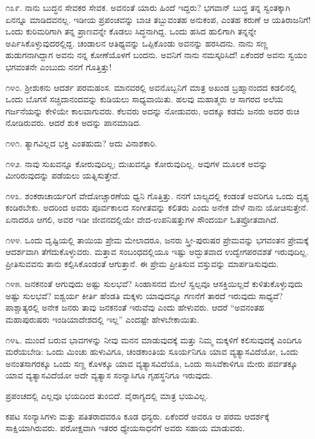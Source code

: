 ೧೩೯. ನಾನು ಬುದ್ಧನ ಸೇವಕರ ಸೇವಕ. ಅವನಂತೆ ಯಾರು ಹಿಂದೆ ಇದ್ದರು? ಭಗವಾನ್ ಬುದ್ಧ ತನ್ನ ಸ್ವಂತಕ್ಕಾಗಿ ಏನನ್ನೂ ಮಾಡಿದವನಲ್ಲ. ಇಡೀಯ ಪ್ರಪಂಚವನ್ನು ಬಾಚಿ ತಬ್ಬುವಂತಹ ಅನುಕಂಪ, ಎಂತಹ ಕರುಣೆ ಆ ಯತಿರಾಜನಿಗೆ! ಒಂದು ಕುರಿಮರಿಗಾಗಿ ತನ್ನ ಪ್ರಾಣವನ್ನೇ ಕೊಡಲು ಸಿದ್ಧನಾಗಿದ್ದ. ಒಂದು ಹಸಿದ ಹುಲಿಗಾಗಿ ತನ್ನನ್ನೇ ಅರ್ಪಿಸಿಕೊಳ್ಳುವುದರಲ್ಲಿದ್ದ. ಚಂಡಾಲನ ಆತಿಥ್ಯವನ್ನು ಒಪ್ಪಿಕೊಂಡು ಅವನನ್ನು ಹರಸಿದನು. ನಾನು ಸಣ್ಣ ಹುಡುಗನಾಗಿದ್ದಾಗ ಅವನು ನನ್ನ ಕೋಣೆಯೊಳಗೆ ಬಂದನು. ಅವನಿಗೆ ನಾನು ನಮಸ್ಕರಿಸಿದೆ! ಏಕೆಂದರೆ ಅವನು ಸ್ವಯಂ ಭಗವಂತನೇ ಎಂಬುದು ನನಗೆ ಗೊತ್ತಿತ್ತು!

೧೪೦. ಶ‍್ರೀಶುಕನು ಆದರ್ಶ ಪರಮಹಂಸ. ಮಾನವರಲ್ಲಿ ಅವನೊಬ್ಬನಿಗೆ ಮಾತ್ರ ಅಖಂಡ ಬ್ರಹ್ಮಾನಂದದ ಕಡಲಿನಲ್ಲಿ ಒಂದು ಬೊಗಸೆ ಸಚ್ಚಿದಾನಂದವನ್ನು ಕುಡಿಯಲು ಸಾಧ್ಯವಾಯಿತು. ಹಲವು ಮಹಾತ್ಮರು ಆ ಸಾಗರದ ಅಲೆಯ ಗರ್ಜನೆಯನ್ನು ಕೇಳಿಯೇ ಕಾಲವಾಗುವರು. ಕೆಲವರು ಅದನ್ನು ನೋಡುವರು, ಅದಕ್ಕೂ ಕಡಮೆ ಜನರು ಅದರ ರುಚಿ ನೋಡಿರುವರು. ಆದರೆ ಶುಕ ಅದನ್ನು ಪಾನಮಾಡಿದ.

೧೪೧. ತ್ಯಾಗವಿಲ್ಲದ ಭಕ್ತಿ ಎಂತಹುದು? ಅದು ವಿನಾಶಕಾರಿ.

೧೪೨. ನಾವು ಸುಖವನ್ನೂ ಕೋರುವುದಿಲ್ಲ; ದುಃಖವನ್ನೂ ಕೋರುವುದಿಲ್ಲ. ಅವುಗಳ ಮೂಲಕ ಅವನ್ನು ಮೀರಿರುವುದನ್ನು ಪಡೆಯಲು ಯತ್ನಿಸುತ್ತೇವೆ.

೧೪೩. ಶಂಕರಾಚಾರ್ಯರಿಗೆ ವೇದೋಚ್ಚಾರಣೆಯ ಧ್ವನಿ ಗೊತ್ತಿತ್ತು. ನನಗೆ ಬಾಲ್ಯದಲ್ಲಿ ಕಂಡಂತೆ ಅವರಿಗೂ ಒಂದು ದೃಶ್ಯ ಕಂಡಿರಬೇಕು. ಅದರಿಂದ ಅವರು ಪೂರ್ವಕಾಲದ ಸಂಗೀತವನ್ನು ಕಲಿತರು ಎಂದು ಅನೇಕ ವೇಳೆ ನಾನು ಯೋಚಿಸುತ್ತೇನೆ. ಏನಾದರೂ ಆಗಲಿ, ಅವರ ಇಡೀ ಜೀವನದಲ್ಲಿಯೇ ವೇದ-ಉಪನಿಷತ್ತುಗಳ ಸೌಂದರ್ಯ ಓತಪ್ರೋತವಾಗಿದೆ.

೧೪೪. ಒಂದು ದೃಷ್ಟಿಯಲ್ಲಿ ತಾಯಿಯ ಪ್ರೇಮ ಮೇಲಾದರೂ, ಜನರು ಸ್ತ್ರೀ-ಪುರುಷರ ಪ್ರೇಮವನ್ನು ಭಗವಂತನ ಪ್ರೇಮಕ್ಕೆ ಆದರ್ಶವಾಗಿ ತೆಗೆದುಕೊಳ್ಳುವರು. ಮತ್ತಾವ ಸಂಬಂಧದಲ್ಲಿಯೂ ಇಷ್ಟು ಅದ್ಭುತವಾದ ಉದ್ವೇಗಪರವಶತೆ ಇರುವುದಿಲ್ಲ. ಪ್ರೀತಿಸುವವನು ತಾನು ಕಲ್ಪಿಸಿಕೊಂಡಂತೆ ಆಗುತ್ತಾನೆ. ಈ ಪ್ರೇಮ ಪ್ರೀತಿಸುವ ವಸ್ತುವನ್ನು ಮಾರ್ಪಡಿಸುವುದು.

೧೪೫. ಜನಕನಂತೆ ಆಗುವುದು ಅಷ್ಟು ಸುಲಭವೆ? ಸಿಂಹಾಸನದ ಮೇಲೆ ಸ್ವಲ್ಪವೂ ಆಸಕ್ತಿಯಿಲ್ಲದೆ ಕುಳಿತುಕೊಳ್ಳುವುದು ಅಷ್ಟು ಸುಲಭವೆ? ಐಶ್ವರ್ಯ ಕೀರ್ತಿ ಹೆಂಡತಿ ಮಕ್ಕಳು ಯಾವುದನ್ನೂ ಗಣನೆಗೆ ತಾರದೆ ಇರುವುದು ಸಾಧ್ಯವೆ? ಪಾಶ್ಚಾತ್ಯರಲ್ಲಿ ಅನೇಕ ಜನರು ತಾವು ಜನಕನಂತೆ ಇರುವೆವು ಎಂದು ಹೇಳುವರು. ಆದರೆ “ಅವನಂತಹ ಮಹಾಪುರುಷರು ಇಂಡಿಯಾದೇಶದಲ್ಲಿ ಇಲ್ಲ” ಎಂದಷ್ಟೇ ಹೇಳಬೇಕಾಯಿತು.

೧೪೬. ಮುಂದೆ ಬರುವ ಭಾವಗಳನ್ನು ನೀವು ಮನನ ಮಾಡುವುದಕ್ಕೆ ಮತ್ತು ನಿಮ್ಮ ಮಕ್ಕಳಿಗೆ ಕಲಿಸುವುದಕ್ಕೆ ಎಂದಿಗೂ ಮರೆಯಬೇಡಿ: ಒಂದು ಮಿಂಚು ಹುಳುವಿಗೂ, ಚಂಡಕಾಂತಿಯ ಸೂರ್ಯನಿಗೂ ಯಾವ ವ್ಯತ್ಯಾಸವಿದೆಯೋ, ಒಂದು ಅನಂತಸಾಗರಕ್ಕೂ ಒಂದು ಸಣ್ಣ ಕೊಳಕ್ಕೂ ಯಾವ ವ್ಯತ್ಯಾಸವಿದೆಯೊ, ಒಂದು ಸಾಸಿವೆಕಾಳಿಗೂ ಮೇರು ಪರ್ವತಕ್ಕೂ ಯಾವ ವ್ಯತ್ಯಾಸವಿದೆಯೋ ಅದೇ ವ್ಯತ್ಯಾಸ ಸಂನ್ಯಾಸಿಗೂ ಗೃಹಸ್ಥನಿಗೂ ಇರುವುದು.

ಪ್ರಪಂಚದಲ್ಲಿ ಎಲ್ಲವೂ ಭಯದಿಂದ ತುಂಬಿದೆ. ವೈರಾಗ್ಯದಲ್ಲಿ ಮಾತ್ರ ಭಯವಿಲ್ಲ.

ಕಪಟ ಸಂನ್ಯಾಸಿಗಳು ಮತ್ತು ಪತಿತರಾದವರೂ ಕೂಡ ಧನ್ಯರು. ಏಕೆಂದರೆ ಅವರೂ ಆ ಪರಮ ಆದರ್ಶಕ್ಕೆ ಸಾಕ್ಷಿಯಾಗಿರುವರು. ಪರೋಕ್ಷವಾಗಿ ಇತರರ ಧ್ಯೇಯಸಾಧನೆಗೆ ಅವರು ಸಹಾಯ ಮಾಡುವರು.

